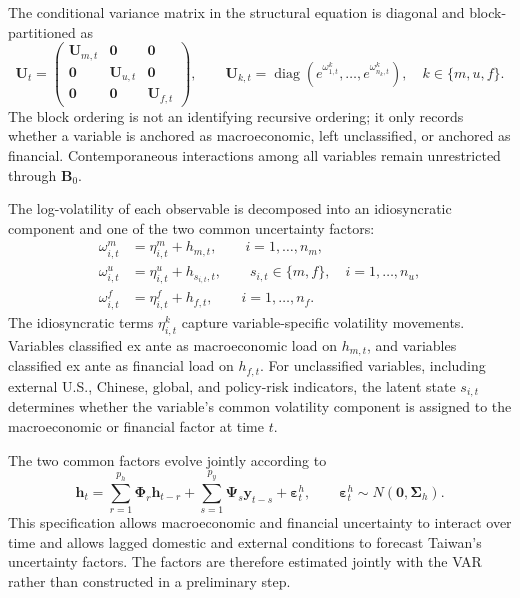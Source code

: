 \documentclass[12pt]{article}
\begin{document}
The conditional variance matrix in the structural equation is diagonal and block-partitioned as
\begin{equation}
\mathbf{U}_t =
\begin{pmatrix}
\mathbf{U}_{m,t} & \mathbf{0} & \mathbf{0} \\
\mathbf{0} & \mathbf{U}_{u,t} & \mathbf{0} \\
\mathbf{0} & \mathbf{0} & \mathbf{U}_{f,t}
\end{pmatrix},\qquad
\mathbf{U}_{k,t}=\operatorname{diag}\!\left(e^{\omega^k_{1,t}},\ldots,
e^{\omega^k_{n_k,t}}\right),\quad k\in\{m,u,f\}.
\label{app:ut}
\end{equation}
The block ordering is not an identifying recursive ordering; it only records whether a variable is
anchored as macroeconomic, left unclassified, or anchored as financial. Contemporaneous
interactions among all variables remain unrestricted through $\mathbf{B}_0$.

The log-volatility of each observable is decomposed into an idiosyncratic component and one of
the two common uncertainty factors:
\begin{align}
\omega^m_{i,t} &= \eta^m_{i,t}+h_{m,t}, \qquad i=1,\ldots,n_m, \nonumber\\
\omega^u_{i,t} &= \eta^u_{i,t}+h_{s_{i,t},t}, \qquad s_{i,t}\in\{m,f\},\quad i=1,\ldots,n_u,
\label{app:logvol}\\
\omega^f_{i,t} &= \eta^f_{i,t}+h_{f,t}, \qquad i=1,\ldots,n_f. \nonumber
\end{align}
The idiosyncratic terms $\eta^k_{i,t}$ capture variable-specific volatility movements. Variables
classified ex ante as macroeconomic load on $h_{m,t}$, and variables classified ex ante as
financial load on $h_{f,t}$. For unclassified variables, including external U.S., Chinese, global,
and policy-risk indicators, the latent state $s_{i,t}$ determines whether the variable's common
volatility component is assigned to the macroeconomic or financial factor at time $t$.

The two common factors evolve jointly according to
\begin{equation}
\mathbf{h}_t
= \sum_{r=1}^{p_h} \boldsymbol{\Phi}_r \mathbf{h}_{t-r}
+ \sum_{s=1}^{p_y} \boldsymbol{\Psi}_s \mathbf{y}_{t-s}
+ \boldsymbol{\varepsilon}^{h}_t,\qquad
\boldsymbol{\varepsilon}^{h}_t \sim N(\mathbf{0},\boldsymbol{\Sigma}_h).
\label{app:hdyn}
\end{equation}
This specification allows macroeconomic and financial uncertainty to interact over time and
allows lagged domestic and external conditions to forecast Taiwan's uncertainty factors. The
factors are therefore estimated jointly with the VAR rather than constructed in a preliminary
step.
\end{document}
